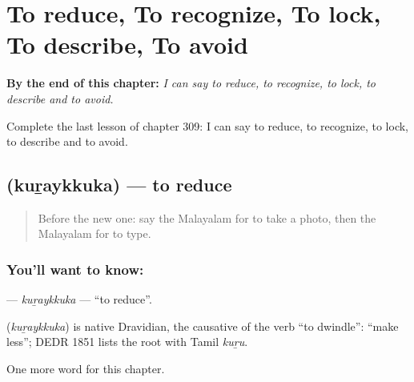 
\chapter{To reduce, To recognize, To lock, To describe, To avoid}
\label{ch:ml-to-reduce-to-recognize-to-lock-to-describe-to-avoid}

\begin{chapteropening}
\textbf{By the end of this chapter:} \emph{I can say to reduce, to recognize, to lock, to describe and to avoid.}

Complete the last lesson of chapter 309: I can say to reduce, to recognize, to lock, to describe and to avoid.
\end{chapteropening}

\section[\texorpdfstring{\ml{കുറയ്ക്കുക} (kuṟaykkuka)}{കുറയ്ക്കുക (kuṟaykkuka)}]{ (kuṟaykkuka) — to reduce}

\label{lesson:ML-C309-kuraykkuka2}



\begin{quote}
Before the new one: say the Malayalam for to take a photo, then the Malayalam for to type.
\end{quote}

\subsection*{You'll want to know: }
\textbf{} — \emph{kuṟaykkuka} — \textquotedblleft{}to reduce\textquotedblright{}.

\begin{cousinweb}
\textbf{} (\emph{kuṟaykkuka}) is native Dravidian, the causative of the verb \textquotedblleft{}to dwindle\textquotedblright{}: \textquotedblleft{}make less\textquotedblright{}; DEDR 1851 lists the root with Tamil \emph{kuṟu}.
\end{cousinweb}

\begin{grammarlens}[title={What you've built}]
One more word for this chapter.
\end{grammarlens}

